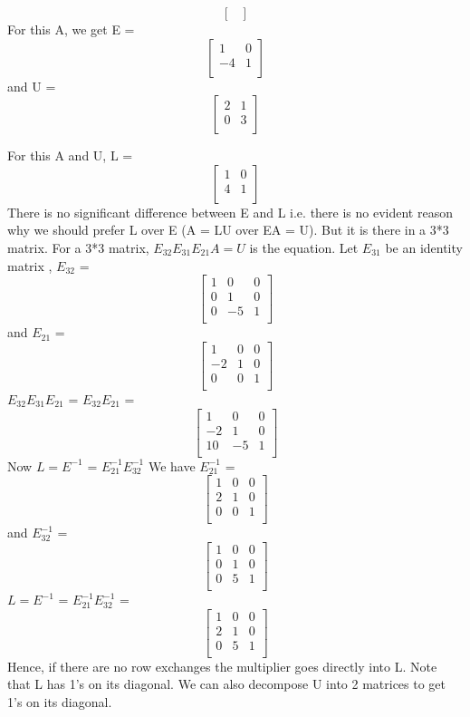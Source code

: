 \documentclass{article}
\begin{document}
\begin{enumerate}
\[\begin{bmatrix}
\end{bmatrix}
\]
\newline
For this A, we get E = \[ \begin{bmatrix}
1 & 0\\
-4 & 1\\
\end{bmatrix}
\] and U = \[ \begin{bmatrix}
2 & 1\\
0 & 3\\
\end{bmatrix}
\]

For this A and U, L = \[ \begin{bmatrix}
1 & 0\\
4 & 1\\
\end{bmatrix}
\]
There is no significant difference between E and L i.e. there is no evident reason why we should prefer L over E (A = LU over EA = U).
But it is there in a 3*3 matrix.
For a 3*3 matrix, $E_{32}E_{31}E_{21}A = U$ is the equation. 
Let $E_{31}$ be an identity matrix ,  $E_{32}$ = \[ \begin{bmatrix}
1 & 0 & 0\\
0 & 1 & 0\\
0 & -5 & 1\\
\end{bmatrix}
\] and 
$E_{21}$ = \[
\begin{bmatrix}
1 & 0 & 0\\
-2 & 1 & 0\\
0 & 0 & 1\\
\end{bmatrix}
\]
$E_{32}E_{31}E_{21}$ =  $E_{32}E_{21}$ = \[
\begin{bmatrix}
1 & 0 & 0\\
-2 & 1 & 0\\
10 & -5 & 1\\
\end{bmatrix}
\]
Now $L = E^{-1}$ = $E_{21}^{-1}E_{32}^{-1}$ 
\newline
We have $E_{21}^{-1}$ = \[
\begin{bmatrix}
1 & 0 & 0\\
2 & 1 & 0\\
0 & 0 & 1\\
\end{bmatrix}
\] and $E_{32}^{-1}$  = \[ \begin{bmatrix}
1 & 0 & 0\\
0 & 1 & 0\\
0 & 5 & 1\\
\end{bmatrix}
\]
 $L = E^{-1}$ = $E_{21}^{-1}E_{32}^{-1}$ = \[
\begin{bmatrix}
1 & 0 & 0\\
2 & 1 & 0\\
0 & 5 & 1\\
\end{bmatrix}
\]
Hence, if there are no row exchanges the multiplier goes directly into L.
\newline
Note that L has 1's on its diagonal. We can also decompose U into 2 matrices to get 1's on its diagonal.


\end{enumerate}
\end{document}
